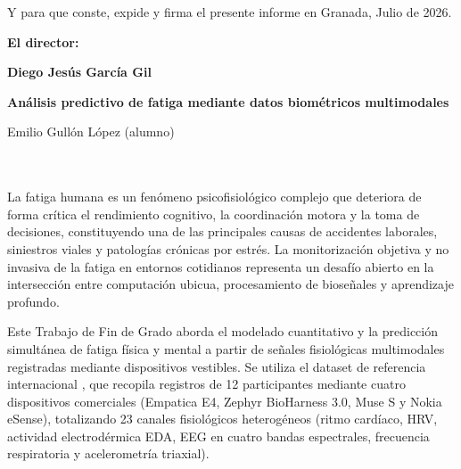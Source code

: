 Y para que conste, expide y firma el presente informe en Granada, Julio de 2026.

\vspace{2cm}

\textbf{El director:}

\vspace{4cm}

\noindent \textbf{Diego Jesús García Gil}

\clearpage

\thispagestyle{empty}

\begin{center}
{\large\bfseries Análisis predictivo de fatiga mediante datos biométricos multimodales}\\
\end{center}
\begin{center}
Emilio Gullón López (alumno)\\
\end{center}

\vspace{0.5cm}
\\

\vspace{0.7cm}
\\

La fatiga humana es un fenómeno psicofisiológico complejo que deteriora de forma crítica el rendimiento cognitivo, la coordinación motora y la toma de decisiones, constituyendo una de las principales causas de accidentes laborales, siniestros viales y patologías crónicas por estrés. La monitorización objetiva y no invasiva de la fatiga en entornos cotidianos representa un desafío abierto en la intersección entre computación ubicua, procesamiento de bioseñales y aprendizaje profundo.

Este Trabajo de Fin de Grado aborda el modelado cuantitativo y la predicción simultánea de fatiga física y mental a partir de señales fisiológicas multimodales registradas mediante dispositivos vestibles. Se utiliza el dataset de referencia internacional \fatigueset{}, que recopila registros de 12 participantes mediante cuatro dispositivos comerciales (Empatica E4, Zephyr BioHarness 3.0, Muse S y Nokia eSense), totalizando 23 canales fisiológicos heterogéneos (ritmo cardíaco, HRV, actividad electrodérmica EDA, EEG en cuatro bandas espectrales, frecuencia respiratoria y acelerometría triaxial).

